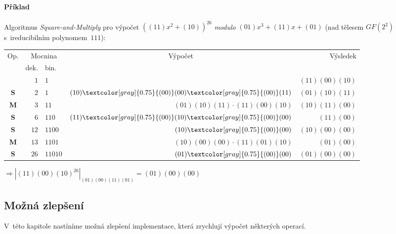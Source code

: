 \documentclass[thesis=M,czech,hidelinks]{FITthesis}[2012/06/26]
\newcommand{\0}{{\textcolor[gray]{0.75}{0}}}
\begin{document}
\paragraph{Příklad} Algoritmus \emph{Square-and-Multiply} pro výpočet
$\left( (11)x^2 + (10) \right)^{26}$ \emph{modulo} $(01)x^3 + (11)x + (01)$
(nad tělesem $GF(2^2)$ s~ireducibilním polynomem~$111$):

\renewcommand{\0}{{\textcolor[gray]{0.75}{(00)}}}
\begin{center}
    \begin{tabular}{c|r|l|r|r}
        \multirow{2}{*}{Op.} & \multicolumn{2}{c}{Mocnina} & \multicolumn{1}{c}{\multirow{2}{*}{Výpočet}} & \multirow{2}{*}{Výsledek} \\
                &  dek. & bin.    &                                     &                \\
        \hline
        \hline
                & $  1$ & $1    $ &                                     & $(11)(00)(10)$ \\
        \hline
    \textbf{S}  & $  2$ & $1    $ & $                (10)\0(00)\0(11) $ & $(01)(10)(11)$ \\
    \textbf{M}  & $  3$ & $11   $ & $ (01)(10)(11) \cdot (11)(00)(10) $ & $(10)(11)(00)$ \\
        \hline
    \textbf{S}  & $  6$ & $110  $ & $                (11)\0(10)\0(00) $ & $    (11)(00)$ \\
        \hline
    \textbf{S}  & $ 12$ & $1100 $ & $                      (10)\0(00) $ & $(10)(00)(00)$ \\
    \textbf{M}  & $ 13$ & $1101 $ & $ (10)(00)(00) \cdot (11)(01)(10) $ & $    (01)(00)$ \\
        \hline
    \textbf{S}  & $ 26$ & $11010$ & $                      (01)\0(00) $ & $(01)(00)(00)$ \\
    \end{tabular}
\end{center}
$
    \Rightarrow
    \left| (11)(00)(10)^{26} \right|_{(01)(00)(11)(01)} = (01)(00)(00)
$


\subsection{Možná zlepšení}\label{kap_telesa_mozna_zlepseni}

V~této kapitole nastíníme možná zlepšení implementace, která zrychlují
výpočet některých operací.
\end{document}
